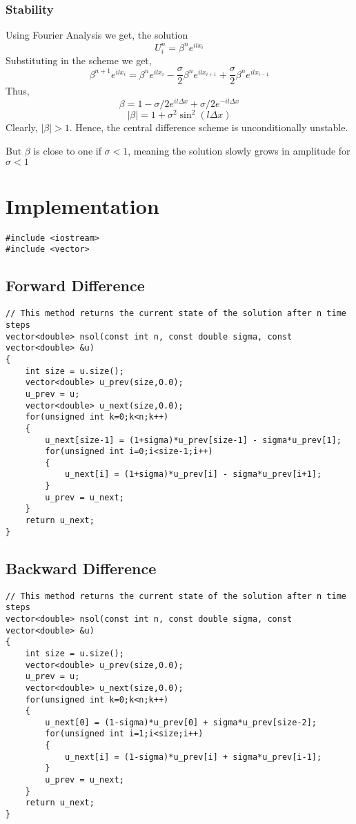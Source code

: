 \documentclass[11pt]{article}
\begin{document}
\subsubsection{Stability}
\label{sec:orga1a91a9}

Using Fourier Analysis we get, the solution
$$U_i^n = \beta^n e^{i l x_i}$$
Substituting in the scheme we get,
$$\beta^{n+1} e^{i l x_i} = \beta^n e^{i l x_i} - \frac{\sigma}{2} \beta^n e^{i l x_{i+1}} + \frac{\sigma}{2} \beta^{n} e^{i l x_{i-1}}$$
Thus,
$$\beta = 1 - \sigma/2 e^{i l \Delta x} + \sigma/2 e^{- i l \Delta x}$$
$$\lvert \beta \rvert = 1 + \sigma^{2} \sin^{2} (l \Delta x)$$
Clearly, \(\lvert \beta \rvert > 1\). Hence, the central difference scheme is unconditionally unstable.

But \(\beta\) is close to one if \(\sigma < 1\), meaning the solution slowly grows in amplitude for \(\sigma < 1\)
\section{Implementation}
\label{sec:orgf83e68a}
\begin{verbatim}
#include <iostream>
#include <vector>
\end{verbatim}

\subsection{Forward Difference}
\label{sec:org1479429}
\begin{verbatim}
// This method returns the current state of the solution after n time steps
vector<double> nsol(const int n, const double sigma, const vector<double> &u)
{
    int size = u.size();
    vector<double> u_prev(size,0.0);
    u_prev = u;
    vector<double> u_next(size,0.0);
    for(unsigned int k=0;k<n;k++)
    {
        u_next[size-1] = (1+sigma)*u_prev[size-1] - sigma*u_prev[1];
        for(unsigned int i=0;i<size-1;i++)
        {
            u_next[i] = (1+sigma)*u_prev[i] - sigma*u_prev[i+1];
        }
        u_prev = u_next;
    }
    return u_next;
}
\end{verbatim}
\subsection{Backward Difference}
\label{sec:org9b5da33}
\begin{verbatim}
// This method returns the current state of the solution after n time steps
vector<double> nsol(const int n, const double sigma, const vector<double> &u)
{
    int size = u.size();
    vector<double> u_prev(size,0.0);
    u_prev = u;
    vector<double> u_next(size,0.0);
    for(unsigned int k=0;k<n;k++)
    {
        u_next[0] = (1-sigma)*u_prev[0] + sigma*u_prev[size-2];
        for(unsigned int i=1;i<size;i++)
        {
            u_next[i] = (1-sigma)*u_prev[i] + sigma*u_prev[i-1];
        }
        u_prev = u_next;
    }
    return u_next;
}
\end{verbatim}
\end{document}
